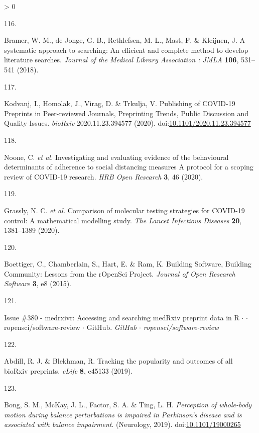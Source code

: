 \documentclass[a4paper, twoside]{templates/ociamthesis}
\newlength{\cslhangindent}
\newlength{\csllabelwidth}
\newenvironment{CSLReferences}[3] %
 {%
  \setlength{\parindent}{0pt}
  \ifodd #1 \everypar{\setlength{\hangindent}{\cslhangindent}}\ignorespaces\fi
  \ifnum #2 > 0
  \setlength{\parskip}{#2\baselineskip}
  \fi
 }%
 {}
\newcommand{\CSLLeftMargin}[1]{\parbox[t]{\maxof{\widthof{#1}}{\csllabelwidth}}{#1}}
\newcommand{\CSLRightInline}[1]{\parbox[t]{\linewidth - \csllabelwidth}{#1}}
\begin{document}
\begin{CSLReferences}{0}{0}
\leavevmode\hypertarget{ref-bramer2018}{}%
\CSLLeftMargin{116. }
\CSLRightInline{Bramer, W. M., de Jonge, G. B., Rethlefsen, M. L., Mast, F. \& Kleijnen, J. A systematic approach to searching: An efficient and complete method to develop literature searches. \emph{Journal of the Medical Library Association : JMLA} \textbf{106}, 531--541 (2018).}

\leavevmode\hypertarget{ref-kodvanj2020}{}%
\CSLLeftMargin{117. }
\CSLRightInline{Kodvanj, I., Homolak, J., Virag, D. \& Trkulja, V. Publishing of {COVID}-19 {Preprints} in {Peer}-reviewed {Journals}, {Preprinting Trends}, {Public Discussion} and {Quality Issues}. \emph{bioRxiv} 2020.11.23.394577 (2020). doi:\href{https://doi.org/10.1101/2020.11.23.394577}{10.1101/2020.11.23.394577}}

\leavevmode\hypertarget{ref-noone2020}{}%
\CSLLeftMargin{118. }
\CSLRightInline{Noone, C. \emph{et al.} Investigating and evaluating evidence of the behavioural determinants of adherence to social distancing measures {} {A} protocol for a scoping review of {COVID}-19 research. \emph{HRB Open Research} \textbf{3}, 46 (2020).}

\leavevmode\hypertarget{ref-grassly2020}{}%
\CSLLeftMargin{119. }
\CSLRightInline{Grassly, N. C. \emph{et al.} Comparison of molecular testing strategies for {COVID}-19 control: A mathematical modelling study. \emph{The Lancet Infectious Diseases} \textbf{20}, 1381--1389 (2020).}

\leavevmode\hypertarget{ref-boettiger2015}{}%
\CSLLeftMargin{120. }
\CSLRightInline{Boettiger, C., Chamberlain, S., Hart, E. \& Ram, K. Building {Software}, {Building Community}: Lessons from the {rOpenSci Project}. \emph{Journal of Open Research Software} \textbf{3}, e8 (2015).}

\leavevmode\hypertarget{ref-zotero-15016}{}%
\CSLLeftMargin{121. }
\CSLRightInline{Issue \#380 - medrxivr: Accessing and searching {medRxiv} preprint data in {R} {\(\cdot\)} {\(\cdot\)} ropensci/software-review {\(\cdot\)} {GitHub}. \emph{GitHub {\(\cdot\)} ropensci/software-review}}

\leavevmode\hypertarget{ref-abdill2019b}{}%
\CSLLeftMargin{122. }
\CSLRightInline{Abdill, R. J. \& Blekhman, R. Tracking the popularity and outcomes of all {bioRxiv} preprints. \emph{eLife} \textbf{8}, e45133 (2019).}

\leavevmode\hypertarget{ref-bong2019}{}%
\CSLLeftMargin{123. }
\CSLRightInline{Bong, S. M., McKay, J. L., Factor, S. A. \& Ting, L. H. \emph{Perception of whole-body motion during balance perturbations is impaired in {Parkinson}'s disease and is associated with balance impairment}. ({Neurology}, 2019). doi:\href{https://doi.org/10.1101/19000265}{10.1101/19000265}}


\end{CSLReferences}
\end{document}
